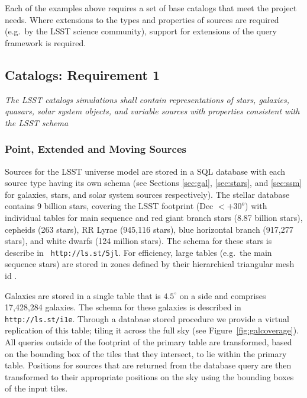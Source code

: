 \documentclass[11pt]{article}
\begin{document}
Each of the examples above requires a set of base catalogs that meet
the project needs.  Where extensions to the types and properties of
sources are required (e.g.\ by the LSST science community), support for
extensions of the query framework is required.

\subsection{Catalogs: Requirement 1}

{\it The LSST catalogs simulations shall contain representations of
  stars, galaxies, quasars, solar system objects, and variable sources
  with properties consistent with the LSST schema}\\

\subsubsection{Point, Extended and Moving Sources}

Sources for the LSST universe model are stored in a SQL database with
each source type having its own schema (see Sections \ref{sec:gal},
\ref{sec:stars}, and \ref{sec:ssm} for galaxies, stars, and solar
system sources respectively). The stellar database contains 9 billion
stars, covering the LSST footprint (Dec $< +30^o$) with individual
tables for main sequence and red giant branch stars (8.87 billion
stars), cepheids (263 stars), RR Lyrae (945,116 stars), blue
horizontal branch (917,277 stars), and white dwarfs (124 million
stars).  The schema for these stars is describe in {\tt
  http://ls.st/5jl}. For efficiency, large tables (e.g.\ the main
sequence stars) are stored in zones defined by their hierarchical
triangular mesh id \citep[HTM][]{htm}.

Galaxies are stored in a single table that is $4.5^{\circ}$ on a side and
comprises 17,428,284 galaxies. The schema for these galaxies is
described in {\tt
  http://ls.st/i1e}.
Through a database stored procedure we provide a virtual replication
of this table; tiling it across the full sky (see
Figure~\ref{fig:galcoverage}). All queries outside of the footprint of
the primary table are transformed, based on the bounding box of the
tiles that they intersect, to lie within the primary table. Positions
for sources that are returned from the database query are then
transformed to their appropriate positions on the sky using the
bounding boxes of the input tiles.
\end{document}
